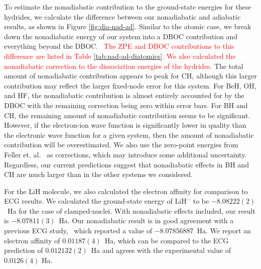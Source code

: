 \documentclass[aip,jcp,numerical,reprint]{revtex4-1}
\begin{document}
To estimate the nonadiabatic contribution to the ground-state energies for these hydrides, we calculate the difference between our nonadiabatic and adiabatic results, as shown in Figure \ref{fig:dia-nad-ad}. Similar to the atomic case, we break down the nonadiabatic energy of our system into a DBOC contribution and everything beyond the DBOC.~\cite{CFOUR,Harding,Feller_DBOC} \textcolor{red}{The ZPE and DBOC contributions to this difference are listed in Table \ref{tab:nad-ad-diatomics}. We also calculated the nonadiabatic correction to the dissociation energies of the hydrides.} The total amount of nonadiabatic contribution appears to peak for CH, although this larger contribution may reflect the larger fixed-node error for this system. For BeH, OH, and HF, the nonadiabatic contribution is almost entirely accounted for by the DBOC with the remaining correction being zero within error bars. For BH and CH, the remaining amount of nonadiabatic contribution seems to be significant. However, if the electron-ion wave function is significantly lower in quality than the electronic wave function for a given system, then the amount of nonadiabatic contribution will be overestimated. We also use the zero-point energies from Feller et. al.~\cite{Feller_Corrections} as corrections, which may introduce some additional uncertainty.  Regardless, our current predictions suggest that nonadiabatic effects in BH and CH are much larger than in the other systems we considered.

For the LiH molecule, we also calculated the electron affinity for comparison to ECG results. We calculated the ground-state energy of LiH$^-$ to be $-8.08222(2)$~Ha for the case of clamped-nuclei. With nonadiabatic effects included, our result is  $-8.07811(3)$~Ha. Our nonadiabatic result is in good agreement with a previous ECG study,~\cite{Bubin_LiH-_noBO} which reported a value of $-8.07856887$~Ha. We report an electron affinity of $0.01187(4)$~Ha, which can be compared to the ECG prediction of $0.012132(2)$~Ha and agrees with the experimental value of $0.0126(4)$ Ha.~\cite{switch}
\end{document}
